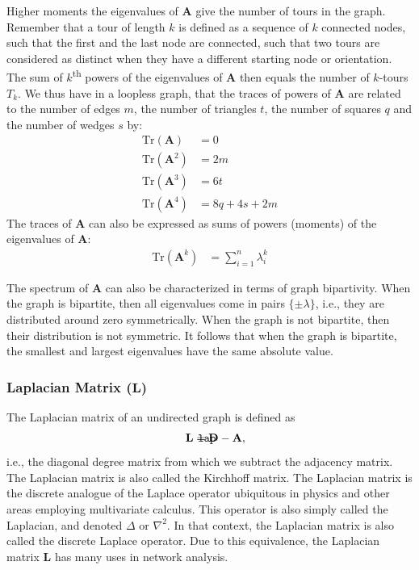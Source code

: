\documentclass{article}
\def\mathnote#1{%
  \tag*{\rlap{\hspace\marginparsep\smash{\parbox[t]{\marginparwidth}{#1}}}}
}
\begin{document}
Higher moments the eigenvalues of $\mathbf A$ give the number of tours
in the graph.  Remember that a tour of length $k$ is defined as a
sequence of $k$ connected nodes, such that the first and the last node
are connected, such that two tours are considered as distinct when they
have a different starting node or orientation. 
The sum of $k$\textsuperscript{th} powers of the
eigenvalues of $\mathbf A$ then equals the number of $k$-tours $T_k$. 
We thus have in a loopless graph, that the traces of powers of $\mathbf
A$ are related to the number of edges $m$, the number of triangles $t$,
the number of squares $q$ and the number of wedges $s$ by:
\begin{align*}
  \mathrm{Tr}(\mathbf A) &= 0 \\
  \mathrm{Tr}(\mathbf A^2) &= 2m \\
  \mathrm{Tr}(\mathbf A^3) &= 6t \\
  \mathrm{Tr}(\mathbf A^4) &= 8q + 4s + 2m
\end{align*}
The traces of $\mathbf A$ can also be expressed as sums of powers
(moments) of the eigenvalues of $\mathbf A$:
\begin{align*}
  \mathrm{Tr}(\mathbf A^k) &= \sum_{i=1}^n \lambda_i^k
\end{align*}

The spectrum of $\mathbf A$ can also be characterized in terms of graph
bipartivity.  When the graph is bipartite, then all eigenvalues come in
pairs $\{\pm\lambda\}$, i.e., they are distributed around zero
symmetrically.  When the graph is not bipartite, then their distribution
is not symmetric.  It follows that when the graph is bipartite, the
smallest and largest eigenvalues have the same absolute value. 

\subsubsection{Laplacian Matrix ($\mathbf L$)}
The Laplacian matrix of an undirected graph is defined as
\begin{align}
  \mathnote{\texttt{lap}}
  \mathbf L &= \mathbf D - \mathbf A,
\end{align}
i.e., the diagonal degree matrix from which we subtract the adjacency
matrix.  The Laplacian matrix is also called the Kirchhoff matrix. 
The Laplacian matrix is the discrete analogue of the Laplace operator
ubiquitous in physics and other areas employing multivariate calculus.
This operator is also simply called the Laplacian, and denoted $\Delta$ or
$\nabla^2$.  In that context, the Laplacian matrix is also called the
discrete Laplace operator. 
Due to this equivalence, the Laplacian matrix $\mathbf L$
has many uses in network analysis. 
\end{document}

